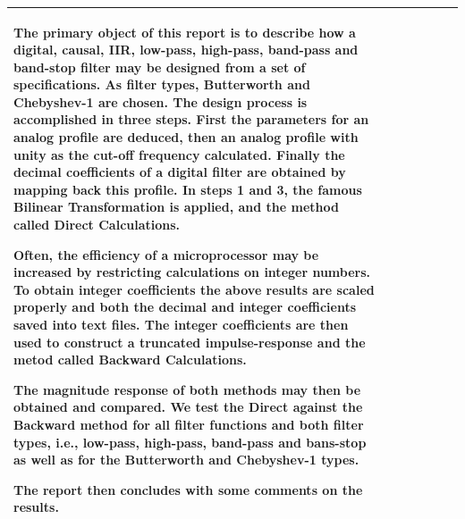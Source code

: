 \documentclass{sebase}
\begin{document}
\begin{tabular}{p{3cm}p{1.5cm}p{1.5cm}p{1.5cm}p{1.5cm}p{1.5cm}p{1.5cm}}
{%
\parbox{14.5cm}{The primary object of this report is to describe how a digital, causal,
IIR, low-pass, high-pass, band-pass and band-stop filter may be designed from a set of
specifications. As filter types, Butterworth and Chebyshev-1 are chosen.
The design process is accomplished in three steps. First the parameters for an analog
profile are deduced, then an analog profile with unity as the cut-off frequency
calculated. Finally the decimal coefficients of a digital filter are obtained by mapping
back this profile. In steps 1 and 3, the famous Bilinear Transformation is applied,
and the method called Direct Calculations.

Often, the efficiency of a microprocessor may be increased by restricting calculations
on integer numbers. To obtain integer coefficients the above results are scaled
properly and both the decimal and integer coefficients saved into text files. The integer
coefficients are then used to construct a truncated impulse-response and the metod
called Backward Calculations.

The magnitude response of both methods may then be obtained and compared.
We test the Direct against the Backward method for all filter functions and both
filter types, i.e., low-pass, high-pass, band-pass and bans-stop as well as for the
Butterworth and Chebyshev-1 types.

The report then concludes with some comments on the results.}%
} \\ \hline\hline
\end{tabular}

\clearpage%
\end{document}
